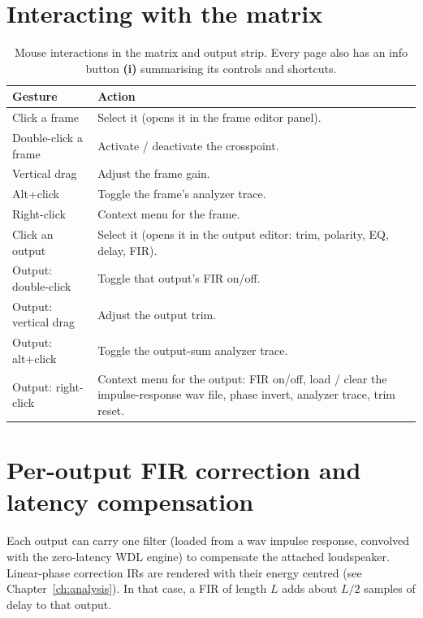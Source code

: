 \section{Interacting with the matrix}
\begin{table}[ht]
\centering
\renewcommand{\arraystretch}{1.25}
\begin{tabularx}{\textwidth}{l X}
\toprule
\textbf{Gesture} & \textbf{Action} \\
\midrule
Click a frame        & Select it (opens it in the frame editor panel). \\
Double-click a frame & Activate / deactivate the crosspoint. \\
Vertical drag        & Adjust the frame gain. \\
Alt+click            & Toggle the frame's analyzer trace. \\
Right-click          & Context menu for the frame. \\
\midrule
Click an output      & Select it (opens it in the output editor: trim,
                       polarity, EQ, delay, FIR). \\
Output: double-click & Toggle that output's FIR on/off. \\
Output: vertical drag& Adjust the output trim. \\
Output: alt+click    & Toggle the output-sum analyzer trace. \\
Output: right-click  & Context menu for the output: FIR on/off, load / clear
                       the impulse-response wav file, phase invert, analyzer
                       trace, trim reset. \\
\bottomrule
\end{tabularx}
\caption{Mouse interactions in the matrix and output strip. Every page also
has an info button \textbf{(i)} summarising its controls and shortcuts.}
\label{tab:gestures}
\end{table}

\section{Per-output FIR correction and latency compensation}\label{sec:latencycomp}
Each output can carry one  filter (loaded from a wav impulse response, convolved with the zero-latency WDL engine) to compensate the attached loudspeaker. Linear-phase correction IRs are rendered with their energy centred (see Chapter~\ref{ch:analysis}). In that case, a FIR of length $L$ adds about $L/2$ samples of delay to that output.

